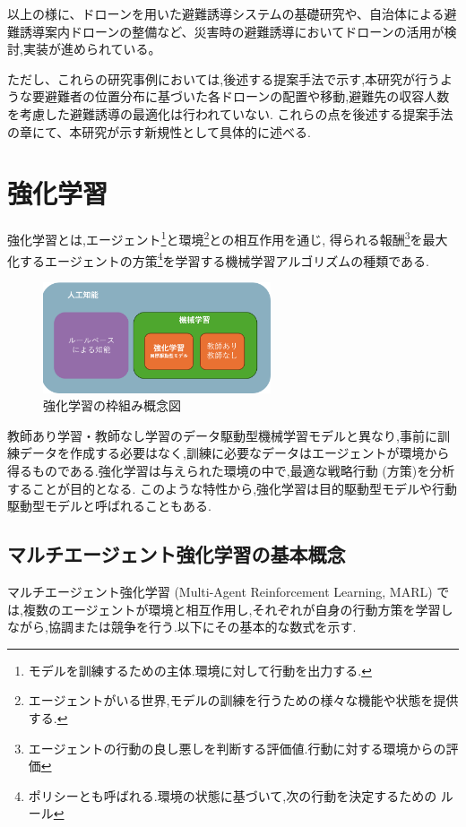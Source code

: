 以上の様に、ドローンを用いた避難誘導システムの基礎研究や、自治体による避難誘導案内ドローンの整備など、災害時の避難誘導においてドローンの活用が検討,実装が進められている。\par

ただし、これらの研究事例においては,後述する提案手法で示す,本研究が行うような要避難者の位置分布に基づいた各ドローンの配置や移動,避難先の収容人数を考慮した避難誘導の最適化は行われていない.
これらの点を後述する提案手法の章にて、本研究が示す新規性として具体的に述べる.

\section{強化学習}
強化学習とは,エージェント\footnote{モデルを訓練するための主体.環境に対して行動を出力する.}と環境\footnote{エージェントがいる世界,モデルの訓練を行うための様々な機能や状態を提供する.}との相互作用を通じ,
得られる報酬\footnote{エージェントの行動の良し悪しを判断する評価値.行動に対する環境からの評価}を最大化するエージェントの方策\footnote{ポリシーとも呼ばれる.環境の状態に基づいて,次の行動を決定するための
ルール}を学習する機械学習アルゴリズムの種類である.
\begin{figure}[H] 
  \centering 
  \includegraphics[width=0.6\textwidth]{Figures/2024-12-09 202235.png}
  \caption{強化学習の枠組み概念図} 
  \label{fig:01} 
\end{figure}
教師あり学習・教師なし学習のデータ駆動型機械学習モデルと異なり,事前に訓練データを作成する必要はなく,訓練に必要なデータはエージェントが環境から得るものである.強化学習は与えられた環境の中で,最適な戦略行動 (方策)を分析することが目的となる.
このような特性から,強化学習は目的駆動型モデルや行動駆動型モデルと呼ばれることもある.

\subsection{マルチエージェント強化学習の基本概念}

マルチエージェント強化学習 (Multi-Agent Reinforcement Learning, MARL) では,複数のエージェントが環境と相互作用し,それぞれが自身の行動方策を学習しながら,協調または競争を行う.以下にその基本的な数式を示す.

